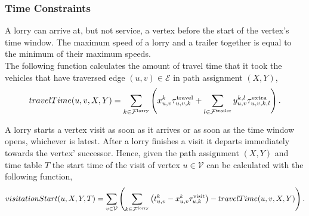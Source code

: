 \subsubsection{Time Constraints}



%

A lorry can arrive at, but not service, a vertex before the start of the vertex's time window.
The maximum speed of a lorry and a trailer together is equal to the minimum of their maximum speeds.
\\

The following function calculates the amount of travel time
 that it took the vehicles that have traversed edge $(u,v) \in \mathcal E$ in path assignment $(X,Y)$,
%
\begin{align}
  travelTime(u,v,X,Y) =
  \sum_{k \in \mathcal F^{\rm lorry}}
  \left (
  x^k_{u,v}
   \tau_{u,v,k}^{\rm travel}
  +
  \sum_{l \in \mathcal F^{\rm trailer}}
  y^{k,l}_{u,v}
  \tau^{\rm extra }_{u,v,k,l}
  \right).
  \notag
  \end{align}

A lorry starts a vertex visit as soon as it arrives or as soon as the time window opens, whichever is latest.
After a lorry finishes a visit it departs immediately towards the vertex' successor.
Hence, given the path assignment $(X,Y)$ and time table $T$ the start time of the visit of vertex $u \in \mathcal V$ can be calculated with the following function,
\begin{align}
  visitationStart(u,X,Y,T) =
  \sum_{v \in \mathcal V}
  \left(
  \sum_{k \in \mathcal F^{\rm lorry}}
  \left(
  t_{u,v}^k -
  x^k_{u,v}
   \tau_{u,k}^{\rm visit}
   \right)
  -
  travelTime(u,v,X,Y)
  \right).
  \notag
\end{align}


